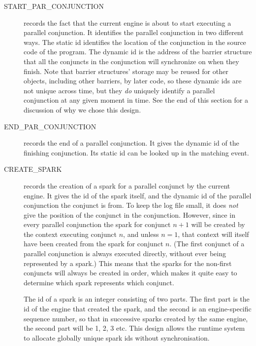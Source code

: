 \begin{description}


\item[START\_PAR\_CONJUNCTION] records the fact that
the current engine is about to start executing a parallel conjunction.
It identifies the parallel conjunction in two different ways.
The static id identifies
the location of the conjunction in the source code of the program.
The dynamic id is the address of the barrier structure
that all the conjuncts in the conjunction will synchronize on when they finish.
Note that barrier structures' storage may be reused for other objects,
including other barriers, by later code,
so these dynamic ids are not unique across time,
but they \emph{do} uniquely identify a parallel conjunction
at any given moment in time.
See the end of this section for a discussion of why we chose this design.

\item[END\_PAR\_CONJUNCTION]
records the end of a parallel conjunction.
It gives the dynamic id of the finishing conjunction.
Its static id can be looked up in the matching
event.

\item[CREATE\_SPARK] records the creation of a spark
for a parallel conjunct by the current engine.
It gives the id of the spark itself,
and the dynamic id of the parallel conjunction the conjunct is from.
To keep the log file small,
it does \emph{not} give the position of the conjunct in the conjunction.
However, since in every parallel conjunction
the spark for conjunct $n+1$
will be created by the context executing conjunct $n$,
and unless $n=1$, that context will itself have been created
from the spark for conjunct $n$.
(The first conjunct of a parallel conjunction is always executed directly,
without ever being represented by a spark.)
This means that the sparks for the non-first conjuncts
will always be created in order,
which makes it quite easy to determine which spark represents which conjunct.

The id of a spark is an integer consisting of two parts.
The first part is the id of the engine that created the spark,
and the second is an engine-specific sequence number,
so that in successive sparks created by the same engine,
the second part will be 1, 2, 3 etc.
This design allows the runtime system
to allocate globally unique spark ids without synchronisation.


\end{description}
